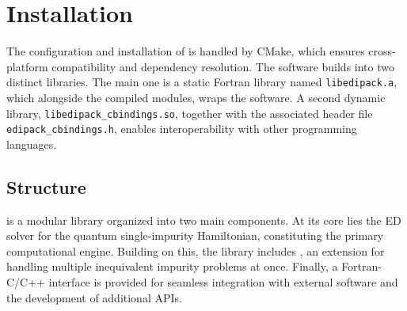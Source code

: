 \documentclass[edipack_sp.tex]{subfiles}
\begin{document}
\section{Installation}\label{SecInstall}
The configuration and installation of \NAME is handled by CMake, which ensures
cross-platform compatibility and dependency resolution.  
The software builds into two distinct libraries.
The main one is a static Fortran library named {\tt libedipack.a}, which alongside the compiled
modules, wraps the \NAME software.
A second dynamic library, {\tt libedipack\_cbindings.so}, together with the associated header
file {\tt edipack\_cbindings.h}, enables interoperability with other programming languages.  


\subsection{Structure}\label{sSecInstallStructure}
\NAME is a modular library organized into two main components. 
At its core lies the ED solver for the quantum
single-impurity Hamiltonian, constituting the primary computational engine.
Building on this, the library includes , an extension for handling multiple inequivalent impurity problems at once. Finally, a Fortran-C/C++ interface is provided for seamless integration with external software and the development of additional APIs.
\end{document}
